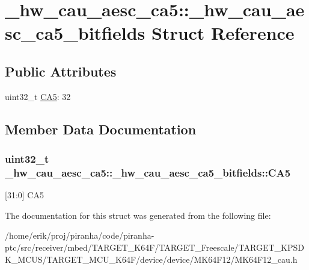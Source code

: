 \hypertarget{struct__hw__cau__aesc__ca5_1_1__hw__cau__aesc__ca5__bitfields}{}\section{\+\_\+hw\+\_\+cau\+\_\+aesc\+\_\+ca5\+:\+:\+\_\+hw\+\_\+cau\+\_\+aesc\+\_\+ca5\+\_\+bitfields Struct Reference}
\label{struct__hw__cau__aesc__ca5_1_1__hw__cau__aesc__ca5__bitfields}
\subsection*{Public Attributes}
\begin{DoxyCompactItemize}
\item 
uint32\+\_\+t \hyperlink{struct__hw__cau__aesc__ca5_1_1__hw__cau__aesc__ca5__bitfields_a65185796e0bf7b4c6d7a9cd8d16705e6}{C\+A5}\+: 32
\end{DoxyCompactItemize}


\subsection{Member Data Documentation}
\subsubsection[{\texorpdfstring{C\+A5}{CA5}}]{\setlength{\rightskip}{0pt plus 5cm}uint32\+\_\+t \+\_\+hw\+\_\+cau\+\_\+aesc\+\_\+ca5\+::\+\_\+hw\+\_\+cau\+\_\+aesc\+\_\+ca5\+\_\+bitfields\+::\+C\+A5}\hypertarget{struct__hw__cau__aesc__ca5_1_1__hw__cau__aesc__ca5__bitfields_a65185796e0bf7b4c6d7a9cd8d16705e6}{}\label{struct__hw__cau__aesc__ca5_1_1__hw__cau__aesc__ca5__bitfields_a65185796e0bf7b4c6d7a9cd8d16705e6}
\mbox{[}31\+:0\mbox{]} C\+A5 

The documentation for this struct was generated from the following file\+:\begin{DoxyCompactItemize}
\item 
/home/erik/proj/piranha/code/piranha-\/ptc/src/receiver/mbed/\+T\+A\+R\+G\+E\+T\+\_\+\+K64\+F/\+T\+A\+R\+G\+E\+T\+\_\+\+Freescale/\+T\+A\+R\+G\+E\+T\+\_\+\+K\+P\+S\+D\+K\+\_\+\+M\+C\+U\+S/\+T\+A\+R\+G\+E\+T\+\_\+\+M\+C\+U\+\_\+\+K64\+F/device/device/\+M\+K64\+F12/M\+K64\+F12\+\_\+cau.\+h\end{DoxyCompactItemize}
